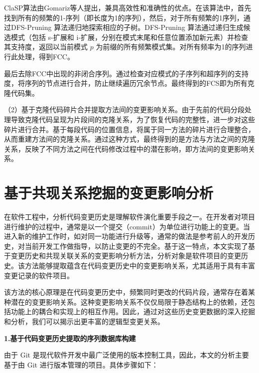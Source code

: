 ClaSP算法由Gomariz等人\cite{2013ClaSP}提出，兼具高效性和准确性的优点。在该算法中，首先找到所有的频繁的1-序列（即长度为1的序列），然后，对于所有频繁的1序列，通过DFS-Pruning 算法递归地探索相应的子树。DFS-Pruning 算法通过递归生成候选模式（包括 s-扩展和 i-扩展，分别在模式末尾和任意位置添加新元素）并检查其支持度，返回以当前模式 $p$ 为前缀的所有频繁模式集。对所有频率为1的序列进行此处理，得到FCC。

最后去除FCC中出现的非闭合序列。通过检查对应模式的子序列和超序列的支持度，将序列的节点进行合并，防止继续遍历冗余节点。最终得到的FCS即为所有克隆代码集。

（2）基于克隆代码碎片合并提取方法间的变更影响关系。由于先前的代码分段处理导致克隆代码呈现为片段间的克隆关系，为了恢复代码的完整性，进一步对这些碎片进行合并。基于每段代码的位置信息，将属于同一方法的碎片进行合理整合，从而重建方法间的克隆关系。通过这种方式，最终得到的是方法与方法之间的克隆关系，反映了不同方法之间在代码修改过程中的潜在影响，即方法间的变更影响关系。

\section{基于共现关系挖掘的变更影响分析}

在软件工程中，分析代码变更历史是理解软件演化重要手段之一。在开发者对项目进行维护的过程中，通常是以一个提交（commit）为单位进行功能上的变更。当进入新的维护工作时，如对同一功能进行升级等，通常的做法是参考前人的开发历史，对当前开发工作做指导，以防止变更的不完全。基于这一特点，本文实现了基于变更历史和共现关联关系的变更影响分析方法，分析对象是软件项目的变更历史。该方法能够提取蕴含在代码变更历史中的变更影响关系，尤其适用于具有丰富变更记录的软件项目。

该方法的核心原理是在代码变更历史中，频繁同时更改的代码片段，通常存在着某种潜在的变更影响关系。这种变更影响关系不仅仅局限于静态结构上的依赖，还包括功能上的耦合和实现上的相互作用。因此，通过对这些历史变更数据的深入挖掘和分析，我们可以揭示出更丰富的逻辑型变更关系。

\noindent \textbf{1.基于代码变更历史提取的序列数据库构建}

由于 Git 是现代软件开发中最广泛使用的版本控制工具，因此，本文的分析主要基于由 Git 进行版本管理的项目。具体步骤如下：

